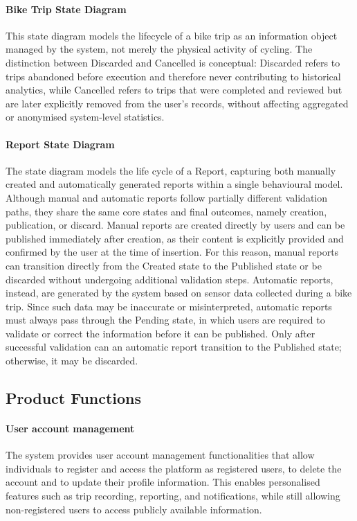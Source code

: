 \paragraph{Bike Trip State Diagram}
This state diagram models the lifecycle of a bike trip as an information object managed by the system, not merely the physical activity of cycling.
The distinction between Discarded and Cancelled is conceptual: Discarded refers to trips abandoned before execution and therefore never contributing to historical analytics, while Cancelled refers to trips that were completed and reviewed but are later explicitly removed from the user’s records, without affecting aggregated or anonymised system-level statistics.

\paragraph{Report State Diagram}
The state diagram models the life cycle of a Report, capturing both manually created and automatically generated reports within a single behavioural model. Although manual and automatic reports follow partially different validation paths, they share the same core states and final outcomes, namely creation, publication, or discard.
Manual reports are created directly by users and can be published immediately after creation, as their content is explicitly provided and confirmed by the user at the time of insertion. For this reason, manual reports can transition directly from the Created state to the Published state or be discarded without undergoing additional validation steps.
Automatic reports, instead, are generated by the system based on sensor data collected during a bike trip. Since such data may be inaccurate or misinterpreted, automatic reports must always pass through the Pending state, in which users are required to validate or correct the information before it can be published. Only after successful validation can an automatic report transition to the Published state; otherwise, it may be discarded.

\subsection{Product Functions}

\paragraph{User account management}
The system provides user account management functionalities that allow individuals to register and access the platform as registered users, to delete the account and to update their profile information. This enables personalised features such as trip recording, reporting, and notifications, while still allowing non-registered users to access publicly available information.

